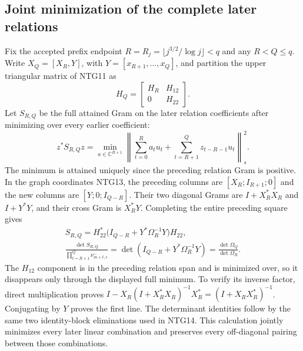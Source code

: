 \subsection{Joint minimization of the complete later relations}
Fix the accepted prefix endpoint
$R=R_j=\lfloor j^{3/2}/\log j\rfloor<q$ and any $R<Q\le q$.
Write $X_Q=[X_R,Y]$, with
$Y=[x_{R+1},\ldots,x_Q]$, and partition the upper triangular
matrix of NTG11 as
\[
 H_Q=\begin{bmatrix}H_R&H_{12}\\0&H_{22}\end{bmatrix}.
                                                               \tag{NTG23}
\]
Let $S_{R,Q}$ be the full attained Gram on the later relation
coefficients after minimizing over every earlier coefficient:
\[
 z^*S_{R,Q}z
   =\min_{a\in\mathbb C^{R+1}}
       \left\|\sum_{t=0}^Ra_tu_t+
                    \sum_{t=R+1}^Qz_{t-R-1}u_t\right\|_s^2 .
                                                               \tag{NTG24}
\]
The minimum is attained uniquely since the preceding relation
Gram is positive. In the graph coordinates NTG13, the
preceding columns are $[X_R;I_{R+1};0]$ and the new columns
are $[Y;0;I_{Q-R}]$. Their two diagonal Grams are
$I+X_R^*X_R$ and $I+Y^*Y$, and their cross Gram is
$X_R^*Y$. Completing the entire preceding square gives
\[
\begin{gathered}
 S_{R,Q}
  =H_{22}^*\bigl(I_{Q-R}+Y^*\Omega_R^{-1}Y\bigr)H_{22},\\
 \frac{\det S_{R,Q}}
      {\displaystyle\prod_{t=R+1}^Q\nu_{m+t,s}^-}
  =\det(I_{Q-R}+Y^*\Omega_R^{-1}Y)
  =\frac{\det\Omega_Q}{\det\Omega_R}.
\end{gathered}                                                    \tag{NTG25}
\]
The $H_{12}$ component is in the preceding relation span
and is minimized over, so it disappears only through the
displayed full minimum. To verify its inverse factor,
direct multiplication proves
$I-X_R(I+X_R^*X_R)^{-1}X_R^*=(I+X_RX_R^*)^{-1}$.
Conjugating by $Y$ proves the first line. The determinant
identities follow by the same two identity-block
eliminations used in NTG14. This calculation jointly
minimizes every later linear combination and preserves
every off-diagonal pairing between those combinations.

